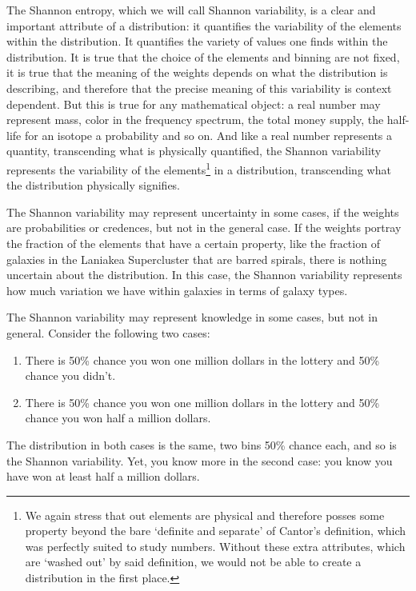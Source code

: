 \documentclass{article}
\begin{document}
The Shannon entropy, which we will call Shannon variability, is a clear and important attribute of a distribution: it quantifies the variability of the elements within the distribution. It quantifies the variety of values one finds within the distribution. It is true that the choice of the elements and binning are not fixed, it is true that the meaning of the weights depends on what the distribution is describing, and therefore that the precise meaning of this variability is context dependent. But this is true for any mathematical object: a real number may represent mass, color in the frequency spectrum, the total money supply, the half-life for an isotope a probability and so on. And like a real number represents a quantity, transcending what is physically quantified, the Shannon variability represents the variability of the elements\footnote{We again stress that out elements are physical and therefore posses some property beyond the bare `definite and separate' of Cantor's definition, which was perfectly suited to study numbers. Without these extra attributes, which are `washed out' by said definition, we would not be able to create a distribution in the first place.} in a distribution, transcending what the distribution physically signifies.

The Shannon variability may represent uncertainty in some cases, if the weights are probabilities or credences, but not in the general case. If the weights portray the fraction of the elements that have a certain property, like the fraction of galaxies in the Laniakea Supercluster that are barred spirals, there is nothing uncertain about the distribution. In this case, the Shannon variability represents how much variation we have within galaxies in terms of galaxy types.

The Shannon variability may represent knowledge in some cases, but not in general. Consider the following two cases:
\begin{enumerate}
\item There is 50\% chance you won one million dollars in the lottery and 50\% chance you didn't.
\item There is 50\% chance you won one million dollars in the lottery and 50\% chance you won half a million dollars.
\end{enumerate}
The distribution in both cases is the same, two bins 50\% chance each, and so is the Shannon variability. Yet, you know more in the second case: you know you have won at least half a million dollars.
\end{document}
